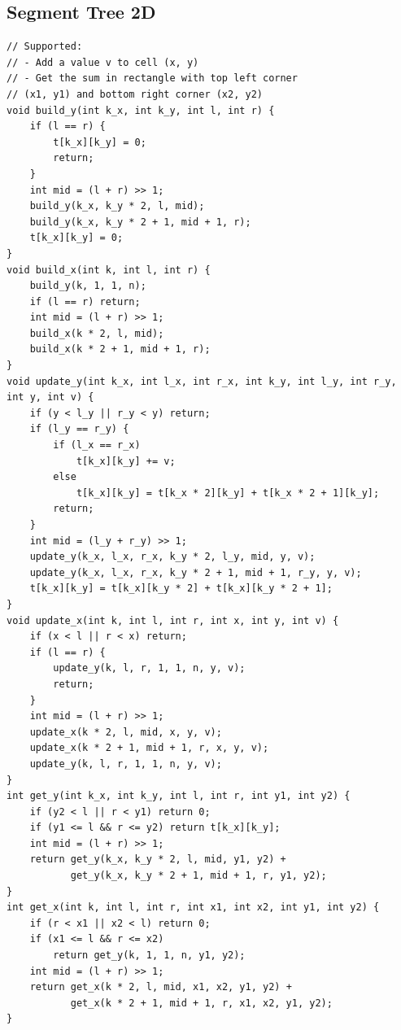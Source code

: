 \documentclass[10pt,letterpaper,landscape]{article}
\begin{document}
\begin{multicols}{2}
\subsection{Segment Tree 2D}
\begin{lstlisting}
// Supported:
// - Add a value v to cell (x, y)
// - Get the sum in rectangle with top left corner 
// (x1, y1) and bottom right corner (x2, y2)
void build_y(int k_x, int k_y, int l, int r) {
    if (l == r) { 
        t[k_x][k_y] = 0; 
        return;
    }
    int mid = (l + r) >> 1;
    build_y(k_x, k_y * 2, l, mid);
    build_y(k_x, k_y * 2 + 1, mid + 1, r);
    t[k_x][k_y] = 0;
}
void build_x(int k, int l, int r) {
    build_y(k, 1, 1, n);
    if (l == r) return;
    int mid = (l + r) >> 1;
    build_x(k * 2, l, mid);
    build_x(k * 2 + 1, mid + 1, r);
}
void update_y(int k_x, int l_x, int r_x, int k_y, int l_y, int r_y, int y, int v) {
    if (y < l_y || r_y < y) return;
    if (l_y == r_y) {
        if (l_x == r_x)
            t[k_x][k_y] += v;
        else
            t[k_x][k_y] = t[k_x * 2][k_y] + t[k_x * 2 + 1][k_y];
        return;
    }
    int mid = (l_y + r_y) >> 1;
    update_y(k_x, l_x, r_x, k_y * 2, l_y, mid, y, v);
    update_y(k_x, l_x, r_x, k_y * 2 + 1, mid + 1, r_y, y, v);
    t[k_x][k_y] = t[k_x][k_y * 2] + t[k_x][k_y * 2 + 1];
}
void update_x(int k, int l, int r, int x, int y, int v) {
    if (x < l || r < x) return;
    if (l == r) {
        update_y(k, l, r, 1, 1, n, y, v);
        return;
    }
    int mid = (l + r) >> 1;
    update_x(k * 2, l, mid, x, y, v);
    update_x(k * 2 + 1, mid + 1, r, x, y, v);
    update_y(k, l, r, 1, 1, n, y, v);
}
int get_y(int k_x, int k_y, int l, int r, int y1, int y2) {
    if (y2 < l || r < y1) return 0;
    if (y1 <= l && r <= y2) return t[k_x][k_y];
    int mid = (l + r) >> 1;
    return get_y(k_x, k_y * 2, l, mid, y1, y2) +
           get_y(k_x, k_y * 2 + 1, mid + 1, r, y1, y2); 
}
int get_x(int k, int l, int r, int x1, int x2, int y1, int y2) {
    if (r < x1 || x2 < l) return 0;
    if (x1 <= l && r <= x2)
        return get_y(k, 1, 1, n, y1, y2);
    int mid = (l + r) >> 1;
    return get_x(k * 2, l, mid, x1, x2, y1, y2) +
           get_x(k * 2 + 1, mid + 1, r, x1, x2, y1, y2); 
}
\end{lstlisting}

\end{multicols}
\end{document}
